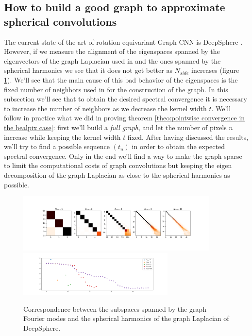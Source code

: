 \clearpage
\subsection{How to build a good graph to approximate spherical convolutions}
\label{sec:How to build a good graph}
The current state of the art of rotation equivariant Graph CNN is DeepSphere \cite{DeepSphere}. However, if we measure the alignment of the eigenspaces spanned by the eigenvectors of the graph Laplacian used in \cite{DeepSphere} and the ones spanned by the spherical harmonics we see that it does not get better as $N_{side}$ increases (figure \ref{fig:deepsphere results}). We'll see that the main cause of this bad behavior of the eigenspaces is the fixed number of neighbors used in \cite{DeepSphere} for the construction of the graph. In this subsection we'll see that to obtain the desired spectral convergence it is necessary to increase the number of neighbors as we decrease the kernel width $t$. We'll follow in practice what we did in proving theorem \ref{theo:pointwise convergence in the healpix case}: first we'll build a \textit{full graph}, and let the number of pixels $n$ increase while keeping the kernel width $t$ fixed. After having discussed the results, we'll try to find a possible sequence $(t_n)$ in order to obtain the expected spectral convergence. Only in the end we'll find a way to make the graph sparse to limit the computational costs of graph convolutions but keeping the eigen decomposition of the graph Laplacian as close to the spherical harmonics as possible.
\begin{figure}[h!]
	\centering
	\includegraphics[width=0.9\textwidth]{../codes/02.HeatKernelGraphLaplacian/HEALPix/06_figures/deepsphere_original.png}
		\includegraphics[width=0.7\textwidth]{../codes/02.HeatKernelGraphLaplacian/HEALPix/06_figures/deepsphere_original_diagonal.png}	
		\caption{\label{fig:deepsphere results}Correspondence between the subspaces spanned by the graph Fourier modes and the spherical harmonics of the graph Laplacian of DeepSphere.}
\end{figure}

